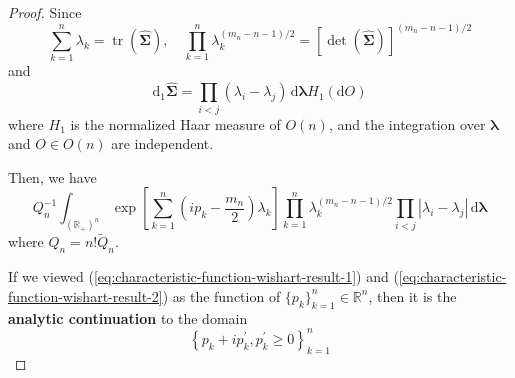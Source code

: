 \begin{proof}
    Since
    \begin{equation}
        \sum_{k=1}^{n}\lambda_{k}=\operatorname{tr}\left(\widehat{\boldsymbol{\Sigma}}\right),\quad\prod_{k=1}^{n}\lambda_{k}^{(m_{n}-n-1)/2}=\left[\operatorname{det}\left(\widehat{\boldsymbol{\Sigma}}\right)\right]^{(m_{n}-n-1)/2}
    \end{equation}
    and
    \begin{equation}
        \mathrm{d}_{1}\widehat{\boldsymbol{\Sigma}}=\prod_{i<j}\left(\lambda_{i}-\lambda_{j}\right)\,\mathrm{d}\boldsymbol{\lambda}H_{1}\left(\mathrm{d}O\right)
    \end{equation}
    where $H_{1}$ is the normalized Haar measure of $O(n)$, and the integration over $\boldsymbol{\lambda}$ and $O\in O(n)$ are independent.

    Then, we have
    \begin{equation}
        Q_{n}^{-1}\int_{\left(\mathbb{R}_{+}\right)^{n}}\exp\left[\sum_{k=1}^{n}\left(i p_{k}-\frac{m_{n}}{2}\right)\lambda_{k}\right]\prod_{k=1}^{n}\lambda_{k}^{(m_{n}-n-1)/2}\prod_{i<j}\left|\lambda_{i}-\lambda_{j}\right|\,\mathrm{d}\boldsymbol{\lambda}
        \label{eq:characteristic-function-wishart-result-2}
    \end{equation}
    where $Q_{n}=n!\widetilde{Q}_{n}$.

    If we viewed (\ref{eq:characteristic-function-wishart-result-1}) and (\ref{eq:characteristic-function-wishart-result-2}) as the function of $\{p_{k}\}_{k=1}^{n}\in\mathbb{R}^{n}$, then it is the \textbf{analytic continuation} to the domain
    \begin{equation}
        \left\{p_{k}+i p_{k}^{\prime},p_{k}^{\prime}\geq 0\right\}_{k=1}^{n}
    \end{equation}



\end{proof}

